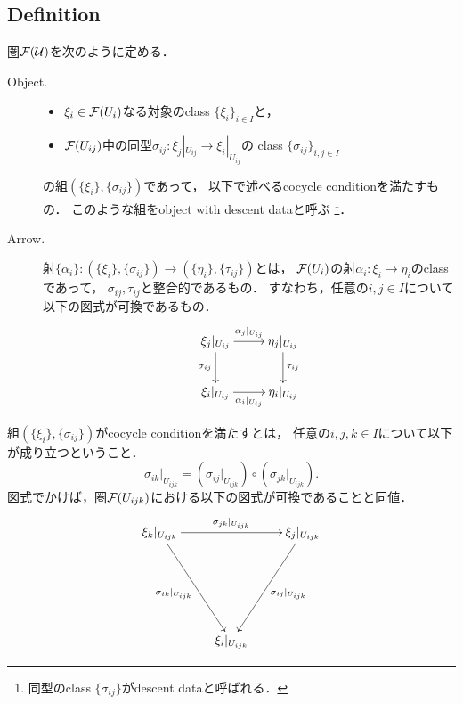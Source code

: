 \documentclass[a4paper, dvipdfmx]{jsarticle}
\begin{document}
\subsection{Definition}
\begin{Def}
    圏$\mathcal{F}(\mathcal{U})$を次のように定める．
    \begin{description}
        \item[Object.] \hfill \vspace{-0.2cm}
            \begin{itemize}
                \item $\xi_i \in \mathcal{F}(U_i)$なる対象のclass $\{\xi_i\}_{i \in I}$と，
                \item
                    $\mathcal{F}(U_{ij})$中の同型$\sigma_{ij} \colon \xi_j|_{U_{ij}} \to \xi_i|_{U_{ij}}$の
                    class $\{\sigma_{ij}\}_{i,j \in I}$
            \end{itemize}
            の組$(\{\xi_i\}, \{\sigma_{ij}\})$であって，
            以下で述べるcocycle conditionを満たすもの．
            このような組をobject with descent dataと呼ぶ
            \footnote{ 同型のclass $\{\sigma_{ij}\}$がdescent dataと呼ばれる． }．

        \item[Arrow.] \mnewline
            射$\{\alpha_i\} \colon (\{\xi_i\}, \{\sigma_{ij}\}) \to (\{\eta_i\}, \{\tau_{ij}\})$とは，
            $\mathcal{F}(U_i)$の射$\alpha_i \colon \xi_i \to \eta_i$のclassであって，\mnewline
            $\sigma_{ij}, \tau_{ij}$と整合的であるもの．
            すなわち，任意の$i, j \in I$について以下の図式が可換であるもの．
            \[\xymatrix{
                \ar[d]_-{\sigma_{ij}} \xi_j|_{U_{ij}} \ar[r]^-{\alpha_j|_{U_{ij}}}&
                \eta_j|_{U_{ij}} \ar[d]^-{\tau_{ij}}\\
                 \xi_i|_{U_{ij}} \ar[r]_-{\alpha_i|_{U_{ij}}}& \eta_i|_{U_{ij}}
            }\]
    \end{description}

    組$(\{\xi_i\}, \{\sigma_{ij}\})$がcocycle conditionを満たすとは，
    任意の$i,j,k \in I$について以下が成り立つということ．
    \[ \sigma_{ik}|_{U_{ijk}}=(\sigma_{ij}|_{U_{ijk}}) \circ (\sigma_{jk}|_{U_{ijk}}). \]
    図式でかけば，圏$\mathcal{F}(U_{ijk})$における以下の図式が可換であることと同値．
    \[\xymatrix@R=70pt{
         \xi_k|_{U_{ijk}} \ar[rd]_-{\sigma_{ik}|_{U_{ijk}}} \ar[rr]^-{\sigma_{jk}|_{U_{ijk}}}
            & {}
            & \xi_j|_{U_{ijk}} \ar[ld]^-{\sigma_{ij}|_{U_{ijk}}} \\
        {} & \xi_i|_{U_{ijk}} & {}
    }\]
\end{Def}
\end{document}
